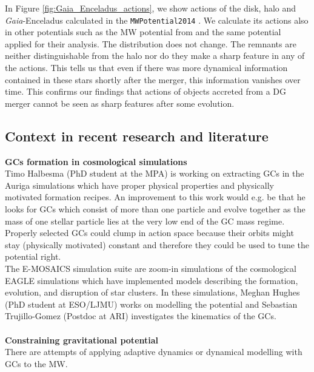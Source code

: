 In Figure \ref{fig:Gaia_Enceladus_actions}, we show actions of the disk, halo and \textit{Gaia}-Enceladus calculated in the \texttt{MWPotential2014} \citep{Bovy...galpy...2015}. We calculate its actions also in other potentials such as the \ac{MW} potential from \citet{McMillan...MWpot...2017} and the same potential \citet{Enceladus....Helmi...2018} applied for their analysis. The distribution does not change. The remnants are neither distinguishable from the halo nor do they make a sharp feature in any of the actions. This tells us that even if there was more dynamical information contained in these stars shortly after the merger, this information vanishes over time. This confirms our findings that actions of objects accreted from a \ac{DG} merger cannot be seen as sharp features after some evolution. 

\subsection{Context in recent research and literature}
\textbf{\acp{GC} formation in cosmological simulations} \\Timo Halbesma (PhD student at the MPA) is working on extracting \acp{GC} in the Auriga simulations which have proper physical properties and physically motivated formation recipes. An improvement to this work would e.g. be that he looks for \acp{GC} which consist of more than one particle and evolve together as the mass of one stellar particle lies at the very low end of the \ac{GC} mass regime. Properly selected \acp{GC} could clump in action space because their orbits might stay (physically motivated) constant and therefore they could be used to tune the potential right. \\
The E-MOSAICS simulation suite \citep{Pfeffer...E-MOSAICS...2018, Kruijssen...E-MOSAICS.MW..2018} are zoom-in simulations of the cosmological EAGLE \citep{Schaye...EAGLE...2015} simulations which have implemented models describing the formation, evolution, and disruption of star clusters. In these simulations, Meghan Hughes (PhD student at ESO/LJMU) works on modelling the potential and Sebastian Trujillo-Gomez (Postdoc at ARI) investigates the kinematics of the \acp{GC}. 
\\\\
\textbf{Constraining gravitational potential}\\
There are attempts of applying adaptive dynamics or dynamical modelling with \acp{GC} to the \ac{MW}.
